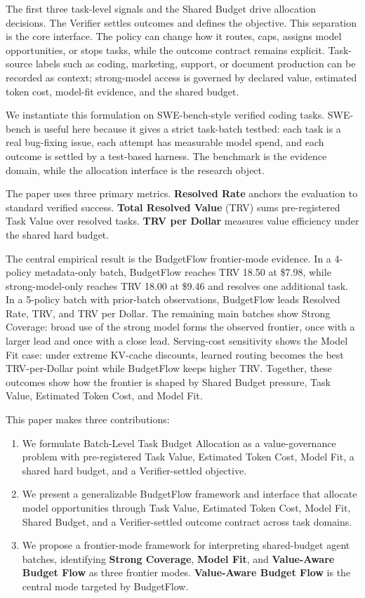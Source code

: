 \documentclass{article}
\newcommand{\method}{BudgetFlow\xspace}
\newcommand{\trv}{TRV\xspace}
\newcommand{\taskvalue}{Task Value\xspace}
\newcommand{\tokencost}{Estimated Token Cost\xspace}
\newcommand{\modelfit}{Model Fit\xspace}
\newcommand{\sharedbudget}{Shared Budget\xspace}
\newcommand{\verifier}{Verifier\xspace}
\begin{document}
The first three task-level signals and the \sharedbudget drive allocation decisions. The \verifier settles outcomes and defines the objective. This separation is the core interface. The policy can change how it routes, caps, assigns model opportunities, or stops tasks, while the outcome contract remains explicit. Task-source labels such as coding, marketing, support, or document production can be recorded as context; strong-model access is governed by declared value, estimated token cost, model-fit evidence, and the shared budget.

We instantiate this formulation on SWE-bench-style verified coding tasks. SWE-bench is useful here because it gives a strict task-batch testbed: each task is a real bug-fixing issue, each attempt has measurable model spend, and each outcome is settled by a test-based harness. The benchmark is the evidence domain, while the allocation interface is the research object.

The paper uses three primary metrics. \textbf{Resolved Rate} anchors the evaluation to standard verified success. \textbf{Total Resolved Value} (\trv) sums pre-registered \taskvalue over resolved tasks. \textbf{\trv per Dollar} measures value efficiency under the shared hard budget.

The central empirical result is the \method frontier-mode evidence. In a 4-policy metadata-only batch, \method reaches \trv 18.50 at \$7.98, while strong-model-only reaches \trv 18.00 at \$9.46 and resolves one additional task. In a 5-policy batch with prior-batch observations, \method leads Resolved Rate, \trv, and \trv per Dollar. The remaining main batches show Strong Coverage: broad use of the strong model forms the observed frontier, once with a larger lead and once with a close lead. Serving-cost sensitivity shows the Model Fit case: under extreme KV-cache discounts, learned routing becomes the best \trv-per-Dollar point while \method keeps higher \trv. Together, these outcomes show how the frontier is shaped by \sharedbudget pressure, \taskvalue, \tokencost, and \modelfit.

This paper makes three contributions:

\begin{enumerate}
    \item We formulate Batch-Level Task Budget Allocation as a value-governance problem with pre-registered \taskvalue, \tokencost, \modelfit, a shared hard budget, and a \verifier-settled objective.
    \item We present a generalizable \method framework and interface that allocate model opportunities through \taskvalue, \tokencost, \modelfit, \sharedbudget, and a \verifier-settled outcome contract across task domains.
    \item We propose a frontier-mode framework for interpreting shared-budget agent batches, identifying \textbf{Strong Coverage}, \textbf{Model Fit}, and \textbf{Value-Aware Budget Flow} as three frontier modes. \textbf{Value-Aware Budget Flow} is the central mode targeted by \method.
\end{enumerate}
\end{document}
